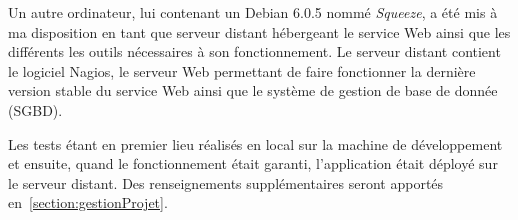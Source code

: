 Un autre ordinateur, lui contenant un Debian 6.0.5 nomm\'e \textit{Squeeze}, a \'et\'e mis \`a ma disposition en tant que serveur distant h\'ebergeant le service Web ainsi que les diff\'erents les outils n\'ecessaires \`a son fonctionnement.
Le serveur distant contient le logiciel Nagios, le serveur Web permettant de faire fonctionner la derni\`ere version stable du service Web ainsi que le syst\`eme de gestion de base de donn\'ee (SGBD).

Les tests \'etant en premier lieu r\'ealis\'es en local sur la machine de d\'eveloppement et ensuite, quand le fonctionnement \'etait garanti, l'application \'etait d\'eploy\'e sur le serveur distant.
Des renseignements suppl\'ementaires seront apport\'es en~\ref{section:gestionProjet}.



\clearpage
